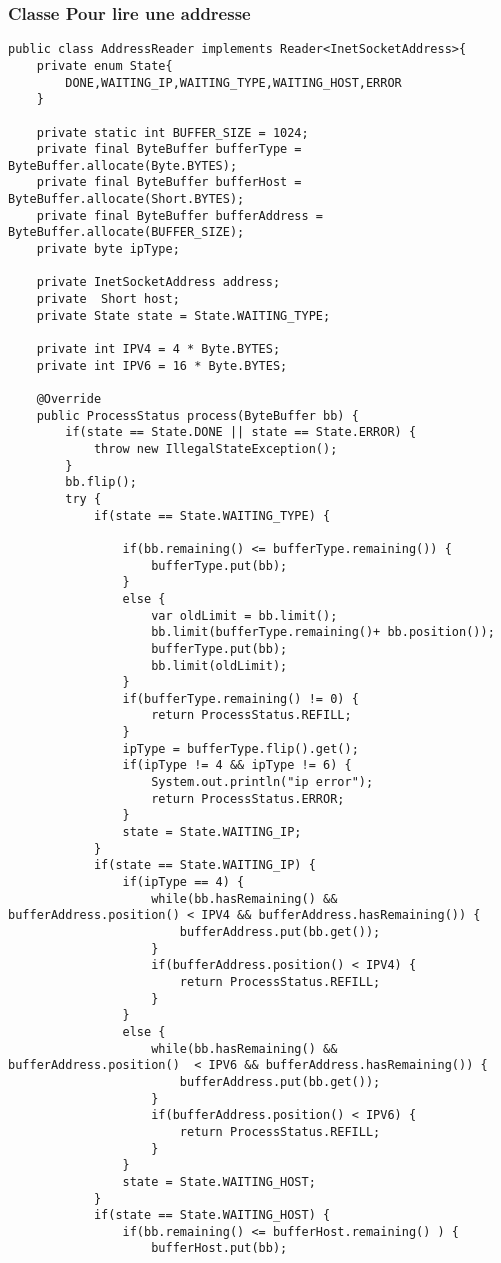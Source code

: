 \documentclass[a4paper,titlepage]{report}
\begin{document}
\subsubsection{Classe Pour lire une addresse}
\begin{lstlisting}
public class AddressReader implements Reader<InetSocketAddress>{
	private enum State{
		DONE,WAITING_IP,WAITING_TYPE,WAITING_HOST,ERROR
	}

	private static int BUFFER_SIZE = 1024;
	private final ByteBuffer bufferType =  ByteBuffer.allocate(Byte.BYTES);
	private final ByteBuffer bufferHost = ByteBuffer.allocate(Short.BYTES);
	private final ByteBuffer bufferAddress = ByteBuffer.allocate(BUFFER_SIZE);
	private byte ipType;
	
	private InetSocketAddress address;
	private  Short host;
	private State state = State.WAITING_TYPE;
	
	private int IPV4 = 4 * Byte.BYTES;
	private int IPV6 = 16 * Byte.BYTES;
	
	@Override
	public ProcessStatus process(ByteBuffer bb) {
		if(state == State.DONE || state == State.ERROR) {
			throw new IllegalStateException();
		}
		bb.flip();
		try {
			if(state == State.WAITING_TYPE) {
				
				if(bb.remaining() <= bufferType.remaining()) {
					bufferType.put(bb);
				}
				else {
					var oldLimit = bb.limit();
					bb.limit(bufferType.remaining()+ bb.position());
					bufferType.put(bb);
					bb.limit(oldLimit);
				}
				if(bufferType.remaining() != 0) {
					return ProcessStatus.REFILL;
				}
				ipType = bufferType.flip().get();
				if(ipType != 4 && ipType != 6) {
					System.out.println("ip error");
					return ProcessStatus.ERROR;
				}
				state = State.WAITING_IP;
			}
			if(state == State.WAITING_IP) {
				if(ipType == 4) {
					while(bb.hasRemaining() && bufferAddress.position() < IPV4 && bufferAddress.hasRemaining()) {
						bufferAddress.put(bb.get());
					}
					if(bufferAddress.position() < IPV4) {
						return ProcessStatus.REFILL;
					}
				}
				else {
					while(bb.hasRemaining() && bufferAddress.position()  < IPV6 && bufferAddress.hasRemaining()) {
						bufferAddress.put(bb.get());
					}
					if(bufferAddress.position() < IPV6) {
						return ProcessStatus.REFILL;
					}
				}
				state = State.WAITING_HOST;
			}
			if(state == State.WAITING_HOST) {
				if(bb.remaining() <= bufferHost.remaining() ) {
					bufferHost.put(bb);
					

\end{lstlisting}
\end{document}
